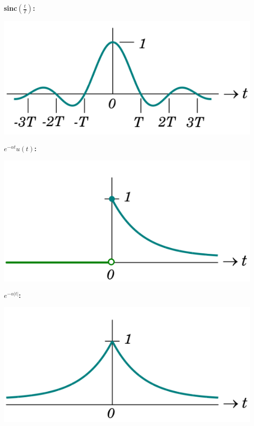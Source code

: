 \documentclass[landscape,a4paper]{extarticle}
\newenvironment{Figure}
  {\noindent\minipage{\linewidth}}
  {\endminipage\par\medskip}
\begin{document}
\begin{multicols*}{5}
    \textbf{sinc$\left(\frac{t}{T}\right)$:}

    \begin{Figure}
        \centering
        \includegraphics[width=0.8\linewidth]{sinc.png}
    \end{Figure}

    \textbf{$e^{-\alpha t}u(t)$: }

    \begin{Figure}
        \centering
        \includegraphics[width=0.8\linewidth]{rightSidedDecayingExp.png}
    \end{Figure}

    \textbf{$e^{-\alpha |t|}$: }

    \begin{Figure}
        \centering
        \includegraphics[width=0.8\linewidth]{twoSidedDecayingExp.png}
    \end{Figure}


\end{multicols*}
\end{document}
